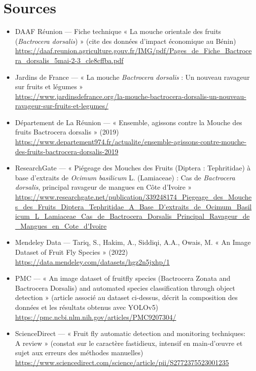 \documentclass[11pt,a4paper]{article}
\begin{document}
\section*{Sources}
\begin{itemize}[leftmargin=*]
    \item[\cite{daaf}] DAAF Réunion --- Fiche technique « La mouche orientale des fruits (\textit{Bactrocera dorsalis}) » (cite des données d'impact économique au Bénin) \\ \url{https://daaf.reunion.agriculture.gouv.fr/IMG/pdf/Pages_de_Fiche_Bactrocera_dorsalis_5mai-2-3_cle8cffba.pdf}
    \item[\cite{jardinsdefrance}] Jardins de France --- « La mouche \textit{Bactrocera dorsalis} : Un nouveau ravageur sur fruits et légumes » \\ \url{https://www.jardinsdefrance.org/la-mouche-bactrocera-dorsalis-un-nouveau-ravageur-sur-fruits-et-legumes/}
    \item[\cite{departement974}] Département de La Réunion --- « Ensemble, agissons contre la Mouche des fruits Bactrocera dorsalis » (2019) \\ \url{https://www.departement974.fr/actualite/ensemble-agissons-contre-mouche-des-fruits-bactrocera-dorsalis-2019}
    \item[\cite{cotedivoire}] ResearchGate --- « Piégeage des Mouches des Fruits (Diptera : Tephritidae) à base d'extraits de \textit{Ocimum basilicum} L. (Lamiaceae) : Cas de \textit{Bactrocera dorsalis}, principal ravageur de mangues en Côte d'Ivoire » \\ \url{https://www.researchgate.net/publication/339248174_Piegeage_des_Mouches_des_Fruits_Diptera_Tephritidae_A_Base_D'extraits_de_Ocimum_Basilicum_L_Lamiaceae_Cas_de_Bactrocera_Dorsalis_Principal_Ravageur_de_Mangues_en_Cote_d'Ivoire}
    \item[\cite{mendeley}] Mendeley Data --- Tariq, S., Hakim, A., Siddiqi, A.A., Owais, M. « An Image Dataset of Fruit Fly Species » (2022) \\ \url{https://data.mendeley.com/datasets/hgz2n5jxhp/1}
    \item[\cite{pmc_fruitfly}] PMC --- « An image dataset of fruitfly species (Bactrocera Zonata and Bactrocera Dorsalis) and automated species classification through object detection » (article associé au dataset ci-dessus, décrit la composition des données et les résultats obtenus avec YOLOv5) \\ \url{https://pmc.ncbi.nlm.nih.gov/articles/PMC9207304/}
    \item[\cite{review_ff}] ScienceDirect --- « Fruit fly automatic detection and monitoring techniques: A review » (constat sur le caractère fastidieux, intensif en main-d'œuvre et sujet aux erreurs des méthodes manuelles) \\ \url{https://www.sciencedirect.com/science/article/pii/S2772375523001235}

\end{itemize}
\end{document}
